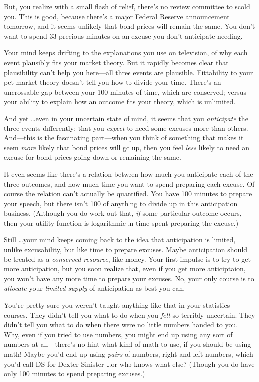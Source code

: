 {
 But, you realize with a small flash of relief,
there's no review committee to scold you. This is good,
because there's a major Federal Reserve announcement
tomorrow, and it seems unlikely that bond prices will remain the same.
You don't want to spend 33 precious minutes on an
excuse you don't anticipate needing.}

{
 Your mind keeps drifting to the explanations you use on
television, of why each event plausibly fits your market theory. But it
rapidly becomes clear that plausibility can't help you
here---all three events are plausible. Fittability to your pet market
theory doesn't tell you how to divide your time.
There's an uncrossable gap between your 100 minutes of
time, which are conserved; versus your ability to explain how an
outcome fits your theory, which is unlimited.}

{
 And yet \ldots even in your uncertain state of mind, it seems that
you \textit{anticipate} the three events differently; that you
\textit{expect} to need some excuses more than others. And---this is
the fascinating part---when you think of something that makes it seem
\textit{more} likely that bond prices will go up, then you feel
\textit{less} likely to need an excuse for bond prices going down or
remaining the same.}

{
 It even seems like there's a relation between how
much you anticipate each of the three outcomes, and how much time you
want to spend preparing each excuse. Of course the relation
can't actually be quantified. You have 100 minutes to
prepare your speech, but there isn't 100 of anything to
divide up in this anticipation business. (Although you do work out
that, \textit{if} some particular outcome occurs, then your utility
function is logarithmic in time spent preparing the excuse.)}

{
 Still \ldots your mind keeps coming back to the idea that
anticipation is limited, unlike excusability, but like time to prepare
excuses. Maybe anticipation should be treated as a \textit{conserved
resource}, like money. Your first impulse is to try to get more
anticipation, but you soon realize that, even if you get more
anticiptaion, you won't have any more time to prepare
your excuses. No, your only course is to \textit{allocate} your
\textit{limited supply} of anticipation as best you can.}

{
 You're pretty sure you weren't
taught anything like that in your statistics courses. They
didn't tell you what to do when you \textit{felt} so
terribly uncertain. They didn't tell you what to do
when there were no little numbers handed to you. Why, even if you tried
to use numbers, you might end up using any sort of numbers at
all---there's no hint what kind of math to use, if you
should be using math! Maybe you'd end up using
\textit{pairs} of numbers, right and left numbers, which
you'd call DS for Dexter-Sinister \ldots or who knows
what else? (Though you do have only 100 minutes to spend preparing
excuses.)}

